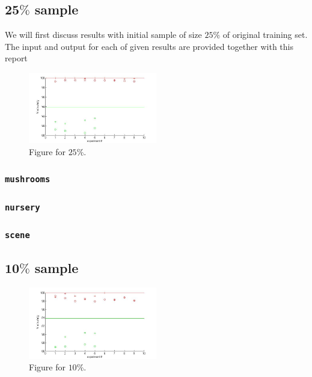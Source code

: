 \documentclass[12pt, a4paper, pdflatex]{report}
\begin{document}
\subsection{$\mathbf{25\%}$ sample~\cite{results25}}
We will first discuss results with initial sample of size $25\%$ of original training set. The input and output for each of given results are provided together with this report

\begin{figure}[htbp]
\centering
  \includegraphics[width=0.5\textwidth]{graphics/figures/Pfig1.jpg}
\begin{tiny}
\caption{\small Figure for $25\%$.\label{img:25pc}}
\end{tiny}
\end{figure}


\subsubsection{\texttt{mushrooms}}
\subsubsection{\texttt{nursery}}
\subsubsection{\texttt{scene}}


\subsection{$\mathbf{10\%}$ sample~\cite{results10}}

\begin{figure}[htbp]
\centering
  \includegraphics[width=0.5\textwidth]{graphics/figures/Pfig2.jpg}
\begin{tiny}
\caption{\small Figure for $10\%$.\label{img:10pc}}
\end{tiny}
\end{figure}
\end{document}
